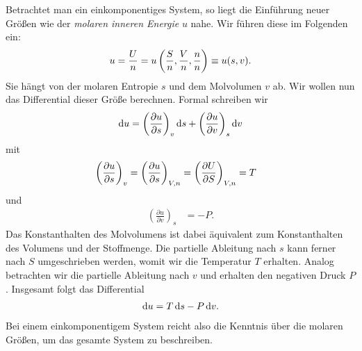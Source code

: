 Betrachtet man ein einkomponentiges System, so liegt die Einführung neuer Größen wie der \emph{molaren inneren Energie} $u$ nahe. Wir führen diese im Folgenden ein:
\begin{align*}
    u=\frac{U}{n}=u\left(\frac{S}{n},\frac{V}{n},\frac{n}{n}\right)\equiv u(s,v).
\end{align*}
Sie hängt von der molaren Entropie $s$ und dem Molvolumen $v$ ab.
Wir wollen nun das Differential dieser Größe berechnen. Formal schreiben wir
\begin{align*}
    \mathop{}\!\mathrm{d} u = \left(\frac{\partial u}{\partial s}\right)_v \mathop{}\!\mathrm{d} s + \left(\frac{\partial u}{\partial v}\right)_s\mathop{}\!\mathrm{d} v
\end{align*}
mit
\begin{align*}
    \left( \frac{\partial u}{\partial s} \right)_v=\left( \frac{\partial u}{\partial s} \right)_{V,n} & =\left( \frac{\partial U}{\partial S} \right)_{V,n} =T
\end{align*}
und
\begin{align*}
    \left(\frac{\partial u}{\partial v}\right)_s & = -P.
\end{align*}
Das Konstanthalten des Molvolumens ist dabei äquivalent zum Konstanthalten des Volumens und der Stoffmenge. Die partielle Ableitung nach $s$ kann ferner nach $S$ umgeschrieben werden, womit wir die Temperatur $T$ erhalten.
Analog betrachten wir die partielle Ableitung nach $v$ und erhalten den negativen Druck $P$.
Insgesamt folgt das Differential
\begin{align*}
    \mathop{}\!\mathrm{d} u = T\mathop{}\!\mathrm{d} s -P\mathop{}\!\mathrm{d} v.
\end{align*}
Bei einem einkomponentigem System reicht also die Kenntnis über die molaren Größen, um das gesamte System zu beschreiben.

